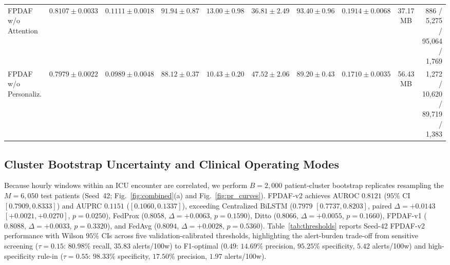 \documentclass{llncs}
\begin{document}
\begin{table}[t]
{\begin{tabular}{lccccccccr}
FPDAF w/o Attention & $0.8107{\pm}0.0033$ & $0.1111{\pm}0.0018$ & $91.94{\pm}0.87$ & $13.00{\pm}0.98$ & $36.81{\pm}2.49$ & $93.40{\pm}0.96$ & $0.1914{\pm}0.0068$ & 37.17 MB & 886 / 5,275 / 95,064 / 1,769 \\
FPDAF w/o Personaliz. & $0.7979{\pm}0.0022$ & $0.0989{\pm}0.0048$ & $88.12{\pm}0.37$ & $10.43{\pm}0.20$ & $47.52{\pm}2.06$ & $89.20{\pm}0.43$ & $0.1710{\pm}0.0035$ & 56.43 MB & 1,272 / 10,620 / 89,719 / 1,383 \\
\bottomrule
\end{tabular}}
\end{table}

\subsection{Cluster Bootstrap Uncertainty and Clinical Operating Modes}

Because hourly windows within an ICU encounter are correlated, we perform $B=2{,}000$ patient-cluster bootstrap replicates resampling the $M=6{,}050$ test patients (Seed~42; Fig.~\ref{fig:combined}(a) and Fig.~\ref{fig:pr_curves}). FPDAF-v2 achieves AUROC $0.8121$ ($95\%$ CI $[0.7909, 0.8333]$) and AUPRC $0.1151$ ($[0.1060, 0.1337]$), exceeding Centralized BiLSTM ($0.7979$ $[0.7737, 0.8203]$, paired $\Delta=+0.0143$ $[+0.0021, +0.0270]$, $p=0.0250$), FedProx ($0.8058$, $\Delta=+0.0063$, $p=0.1590$), Ditto ($0.8066$, $\Delta=+0.0055$, $p=0.1660$), FPDAF-v1 ($0.8088$, $\Delta=+0.0033$, $p=0.3320$), and FedAvg ($0.8094$, $\Delta=+0.0028$, $p=0.5360$). Table~\ref{tab:thresholds} reports Seed-42 FPDAF-v2 performance with Wilson $95\%$ CIs across five validation-calibrated thresholds, highlighting the alert-burden trade-off from sensitive screening ($\tau=0.15$: $80.98\%$ recall, $35.83$ alerts/100w) to F1-optimal ($0.49$: $14.69\%$ precision, $95.25\%$ specificity, $5.42$ alerts/100w) and high-specificity rule-in ($\tau=0.55$: $98.33\%$ specificity, $17.50\%$ precision, $1.97$ alerts/100w).
\end{document}
